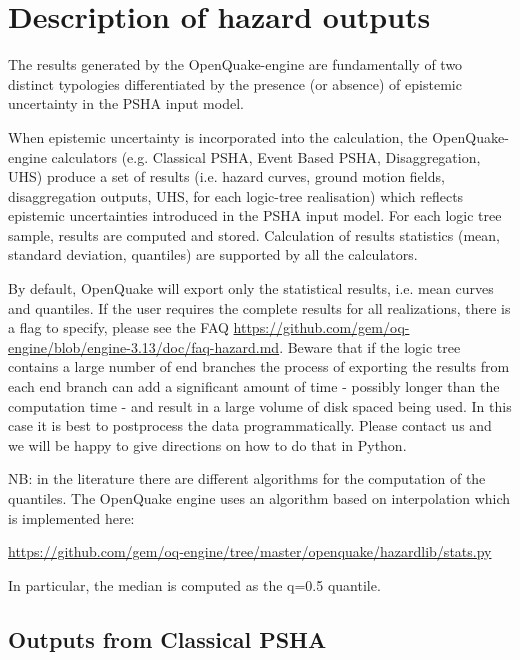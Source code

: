 \section{Description of hazard outputs}
\label{sec:hazard_outputs}

The results generated by the OpenQuake-engine are fundamentally of two
distinct typologies differentiated by the presence (or absence) of epistemic
uncertainty in the PSHA input model.

When epistemic uncertainty is incorporated into the calculation, the
OpenQuake-engine calculators (e.g. Classical PSHA, Event Based PSHA,
Disaggregation, UHS) produce a set of results (i.e. hazard curves, ground
motion fields, disaggregation outputs, UHS, for each logic-tree realisation)
which reflects epistemic uncertainties introduced in the PSHA input model.
For each logic tree sample, results are computed and stored. Calculation of
results statistics (mean, standard deviation, quantiles) are supported by all
the calculators.

By default, OpenQuake will export only the statistical results, i.e. mean
curves and quantiles. If the user requires the complete results for all
realizations, there is a flag to specify, please see the FAQ \href{https://github.com/gem/oq-engine/blob/engine-3.13/doc/faq-hazard.md}{https://github.com/gem/oq-engine/blob/engine-3.13/doc/faq-hazard.md}.
Beware that if the logic tree contains a large number of end branches the
process of exporting the results from each end branch can add a significant
amount of time - possibly longer than the computation time - and result in a
large volume of disk spaced being used. In this case it is best to postprocess
the data programmatically. Please contact us and we will be happy to give
directions on how to do that in Python.

NB: in the literature there are different algorithms for the computation
of the quantiles. The OpenQuake engine uses an algorithm based on interpolation
which is implemented here:

\href{https://github.com/gem/oq-engine/tree/master/openquake/hazardlib/stats.py}{https://github.com/gem/oq-engine/tree/master/openquake/hazardlib/stats.py}

In particular, the median is computed as the q=0.5 quantile.

\subsection{Outputs from Classical PSHA}
\label{subsec:output_classical_psha}


